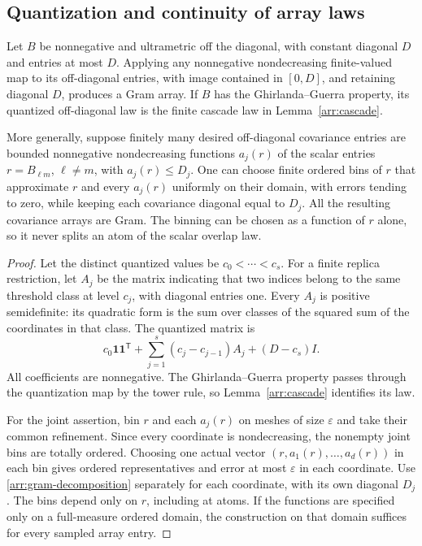 \subsection{Quantization and continuity of array laws}

\begin{lemma}
\label{arr:quantization}
Let $B$ be nonnegative and ultrametric off the diagonal, with constant
diagonal $D$ and entries at most $D$.  Applying any nonnegative
nondecreasing finite-valued map to its off-diagonal entries, with image
contained in $[0,D]$, and retaining diagonal $D$, produces a Gram array.
If $B$ has the Ghirlanda--Guerra property, its quantized off-diagonal law
is the finite cascade law in Lemma~\ref{arr:cascade}.

More generally, suppose finitely many desired off-diagonal covariance
entries are bounded nonnegative nondecreasing functions $a_j(r)$ of the
scalar entries $r=B_{\ell m}$, $\ell\ne m$, with $a_j(r)\leq D_j$.
One can choose finite ordered
bins of $r$ that approximate $r$ and every $a_j(r)$ uniformly on their
domain, with errors tending to zero, while keeping each covariance
diagonal equal to $D_j$.  All the resulting covariance arrays are Gram.
The binning can be chosen as a function of $r$ alone, so it never splits
an atom of the scalar overlap law.
\end{lemma}

\begin{proof}
Let the distinct quantized values be $c_0<\cdots<c_s$.  For a finite
replica restriction, let $A_j$ be the matrix indicating that two indices
belong to the same threshold class at level $c_j$, with diagonal entries
one.  Every $A_j$ is positive semidefinite: its quadratic form is the sum
over classes of the squared sum of the coordinates in that class.  The
quantized matrix is
\begin{equation}
 c_0\mathbf1\mathbf1^{\mathsf T}
 +\sum_{j=1}^s(c_j-c_{j-1})A_j+(D-c_s)I.
 \label{arr:gram-decomposition}
\end{equation}
All coefficients are nonnegative.  The Ghirlanda--Guerra property passes
through the quantization map by the tower rule, so
Lemma~\ref{arr:cascade} identifies its law.

For the joint assertion, bin $r$ and each $a_j(r)$ on meshes of size
$\varepsilon$ and take their common refinement.  Since every coordinate
is nondecreasing, the nonempty joint bins are totally ordered.  Choosing
one actual vector $(r,a_1(r),\ldots,a_d(r))$ in each bin gives ordered
representatives and error at most $\varepsilon$ in each coordinate.
Use \eqref{arr:gram-decomposition} separately for each coordinate, with
its own diagonal $D_j$.  The bins depend only on $r$, including at atoms.
If the functions are specified only on a full-measure ordered domain,
the construction on that domain suffices for every sampled array entry.
\end{proof}

